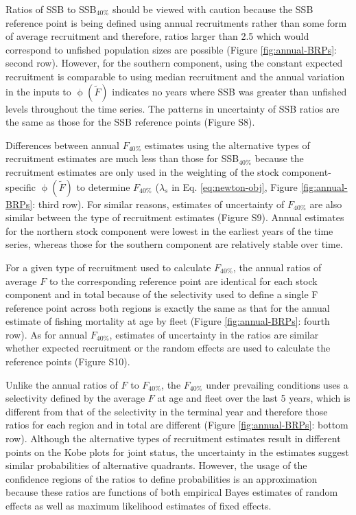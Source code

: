 \documentclass[
]{article}
\begin{document}
Ratios of SSB to SSB\(_{40\%}\) should be viewed with caution because the SSB reference point is being defined using annual recruitments rather than some form of average recruitment and therefore, ratios larger than 2.5 which would correspond to unfished population sizes are possible (Figure \ref{fig:annual-BRPs}: second row). However, for the southern component, using the constant expected recruitment is comparable to using median recruitment and the annual variation in the inputs to \(\upphi(\widetilde{F})\) indicates no years where SSB was greater than unfished levels throughout the time series. The patterns in uncertainty of SSB ratios are the same as those for the SSB reference points (Figure S8).

Differences between annual \(F_{40\%}\) estimates using the alternative types of recruitment estimates are much less than those for SSB\(_{40\%}\) because the recruitment estimates are only used in the weighting of the stock component-specific \(\upphi(\widetilde{F})\) to determine \(F_{40\%}\) (\(\lambda_s\) in Eq. \ref{eq:newton-obj}, Figure \ref{fig:annual-BRPs}: third row). For similar reasons, estimates of uncertainty of \(F_{40\%}\) are also similar between the type of recruitment estimates (Figure S9). Annual estimates for the northern stock component were lowest in the earliest years of the time series, whereas those for the southern component are relatively stable over time.

For a given type of recruitment used to calculate \(F_{40\%}\), the annual ratios of average \(F\) to the corresponding reference point are identical for each stock component and in total because of the selectivity used to define a single F reference point across both regions is exactly the same as that for the annual estimate of fishing mortality at age by fleet (Figure \ref{fig:annual-BRPs}: fourth row). As for annual \(F_{40\%}\), estimates of uncertainty in the ratios are similar whether expected recruitment or the random effects are used to calculate the reference points (Figure S10).

Unlike the annual ratios of \(F\) to \(F_{40\%}\), the \(F_{40\%}\) under prevailing conditions uses a selectivity defined by the average \(F\) at age and fleet over the last 5 years, which is different from that of the selectivity in the terminal year and therefore those ratios for each region and in total are different (Figure \ref{fig:annual-BRPs}: bottom row). Although the alternative types of recruitment estimates result in different points on the Kobe plots for joint status, the uncertainty in the estimates suggest similar probabilities of alternative quadrants. However, the usage of the confidence regions of the ratios to define probabilities is an approximation because these ratios are functions of both empirical Bayes estimates of random effects as well as maximum likelihood estimates of fixed effects.
\end{document}
